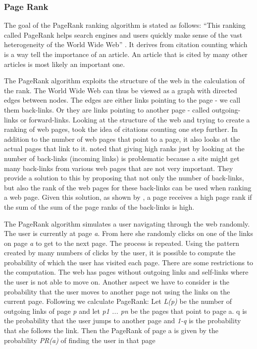 \subsubsection{Page Rank}
The goal of the PageRank ranking algorithm is stated as follows: “This ranking called PageRank helps search engines and users quickly make sense of the vast heterogeneity of the World Wide Web” \citep[p. 1]{Page1999}. It derives from citation counting which is a way tell the importance of an article. An article that is cited by many other articles is most likely an important one. 

The PageRank algorithm exploits the structure of the web in the calculation of the rank. The World Wide Web can thus be viewed as a graph with directed edges between nodes. The edges are either links pointing to the page - we call them back-links. Or they are links pointing to another page - called outgoing-links or forward-links. Looking at the structure of the web and trying to create a ranking of web pages, \citet{Page1999}%
took the idea of citations counting one step further. In addition to the number of web pages that point to a page, it also looks at the actual pages that link to it. 
\citet{Page1999} noted that giving high ranks just by looking at the number of back-links (incoming links) is problematic because a site might get many back-links from various web pages that are not very important. They provide a solution to this by proposing that not only the number of back-links, but also the rank of the web pages for these back-links can be used when ranking a web page. Given this solution, as shown by \citet{Page1999}, a page receives a high page rank if the sum of the sum of the page ranks of the back-links is high.

The PageRank algorithm simulates a user navigating through the web randomly. The user is currently at page \emph{a}. From here she randomly clicks on one of the links on page \emph{a} to get to the next page. The process is repeated. Using the pattern created by many numbers of clicks by the user, it is possible to compute the probability of which the user has visited each page. There are some restrictions to the computation. The web has pages without outgoing links and self-links where the user is not able to move on. Another aspect we have to consider is the probability that the user moves to another page not using the links on the current page. Following we calculate PageRank:
Let \emph{L(p)} be the number of outgoing links of page \emph{p} and let \emph{p1 ... pn} be the pages that point to page a. q is the probability that the user jumps to another page and \emph{1-q} is the probability that she follows the link.  Then the PageRank of page a is given by the probability \emph{PR(a)} of finding the user in that page

